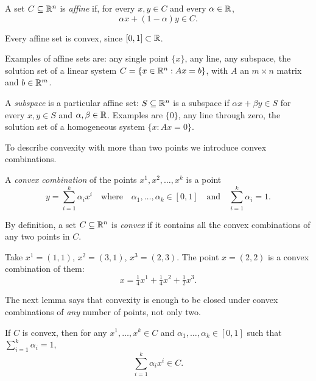 \begin{definition}
A set $C \subseteq \mathbb{R}^n$ is \emph{affine} if, for every $x, y \in C$ and every $\alpha \in \mathbb{R}$,
\[
  \alpha x + (1-\alpha) y \in C.
\]
\end{definition}

\begin{remark}
Every affine set is convex, since $[0,1] \subset \mathbb{R}$.
\end{remark}

Examples of affine sets are: any single point $\{x\}$, any line, any subspace, the solution set of a linear system $C = \{x \in \mathbb{R}^n : Ax = b\}$, with $A$ an $m \times n$ matrix and $b \in \mathbb{R}^m$.

A \emph{subspace} is a particular affine set: $S \subseteq \mathbb{R}^n$ is a subspace if $\alpha x + \beta y \in S$ for every $x, y \in S$ and $\alpha, \beta \in \mathbb{R}$. Examples are $\{0\}$, any line through zero, the solution set of a homogeneous system $\{x : Ax = 0\}$.

To describe convexity with more than two points we introduce convex combinations.

\begin{definition}
A \emph{convex combination} of the points $x^1,x^2,\dots,x^k$ is a point
\[
    y=\sum_{i=1}^{k} \alpha_i x^i
    \quad \text{where} \quad
    \alpha_1,\dots,\alpha_k \in [0,1]
    \quad\text{and} \quad
     \sum_{i=1}^{k}\alpha_i=1.
\]
\end{definition}

\begin{remark}
By definition, a set $C \subseteq \mathbb{R}^n$ is \emph{convex} if it contains all the convex combinations of any two points in $C$.
\end{remark}

\begin{example}
Take $x^1 = (1,1)$, $x^2 = (3,1)$, $x^3 = (2,3)$. The point $x = (2,2)$ is a convex combination of them:
\[
    x = \tfrac{1}{4} x^1 + \tfrac{1}{4} x^2 + \tfrac{1}{2} x^3.
\]
\end{example}

The next lemma says that convexity is enough to be closed under convex combinations of \emph{any} number of points, not only two.

\begin{lemma}
If $C$ is convex, then for any $x^1,\dots,x^k \in C$ and $\alpha_1,\dots,\alpha_k \in [0,1]$ such that $\sum_{i=1}^{k}\alpha_i=1$,
\[
    \sum_{i=1}^{k}\alpha_ix^i \in C.
\]
\end{lemma}

